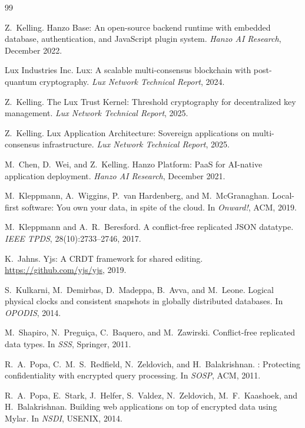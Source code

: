 \begin{thebibliography}{99}

Z.~Kelling.
\newblock Hanzo Base: An open-source backend runtime with embedded database,
authentication, and {JavaScript} plugin system.
\newblock \emph{Hanzo AI Research}, December 2022.

{Lux Industries Inc}.
\newblock Lux: A scalable multi-consensus blockchain with post-quantum
cryptography.
\newblock \emph{Lux Network Technical Report}, 2024.

Z.~Kelling.
\newblock The Lux Trust Kernel: Threshold cryptography for decentralized key
management.
\newblock \emph{Lux Network Technical Report}, 2025.

Z.~Kelling.
\newblock Lux Application Architecture: Sovereign applications on
multi-consensus infrastructure.
\newblock \emph{Lux Network Technical Report}, 2025.

M.~Chen, D.~Wei, and Z.~Kelling.
\newblock Hanzo Platform: {PaaS} for {AI}-native application deployment.
\newblock \emph{Hanzo AI Research}, December 2021.

M.~Kleppmann, A.~Wiggins, P.~van Hardenberg, and M.~McGranaghan.
\newblock Local-first software: You own your data, in spite of the cloud.
\newblock In \emph{Onward!}, ACM, 2019.

M.~Kleppmann and A.~R.~Beresford.
\newblock A conflict-free replicated {JSON} datatype.
\newblock \emph{IEEE TPDS}, 28(10):2733--2746, 2017.

K.~Jahns.
\newblock Yjs: A {CRDT} framework for shared editing.
\newblock \url{https://github.com/yjs/yjs}, 2019.

S.~Kulkarni, M.~Demirbas, D.~Madeppa, B.~Avva, and M.~Leone.
\newblock Logical physical clocks and consistent snapshots in globally
distributed databases.
\newblock In \emph{OPODIS}, 2014.

M.~Shapiro, N.~Pregui\c{c}a, C.~Baquero, and M.~Zawirski.
\newblock Conflict-free replicated data types.
\newblock In \emph{SSS}, Springer, 2011.

R.~A.~Popa, C.~M.~S.~Redfield, N.~Zeldovich, and H.~Balakrishnan.
: Protecting confidentiality with encrypted query processing.
\newblock In \emph{SOSP}, ACM, 2011.

R.~A.~Popa, E.~Stark, J.~Helfer, S.~Valdez, N.~Zeldovich,
M.~F.~Kaashoek, and H.~Balakrishnan.
\newblock Building web applications on top of encrypted data using {Mylar}.
\newblock In \emph{NSDI}, USENIX, 2014.

\end{thebibliography}

